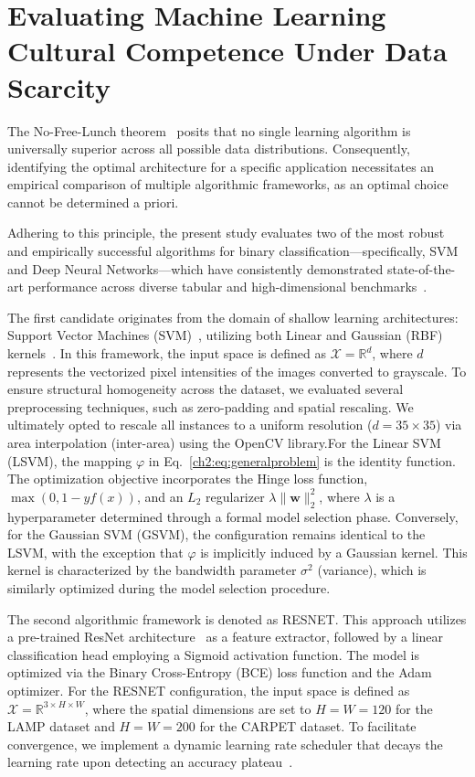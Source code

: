 \section{Evaluating Machine Learning Cultural Competence Under Data Scarcity}
\label{ch3:sec:exp_standard_ml}
%
The No-Free-Lunch theorem~\citep{wolpert1996lack} posits that no single learning algorithm is universally superior across all possible data distributions.
Consequently, identifying the optimal architecture for a specific application necessitates an empirical comparison of multiple algorithmic frameworks, as an optimal choice cannot be determined a priori.

Adhering to this principle, the present study evaluates two of the most robust and empirically successful algorithms for binary classification—specifically, SVM and Deep Neural Networks—which have consistently demonstrated state-of-the-art performance across diverse tabular and high-dimensional benchmarks~\citep{fernandez2014we,wainberg2016random,shu2021zoo}.

The first candidate originates from the domain of shallow learning architectures: Support Vector Machines (SVM)~\citep{shalev2014understanding}, utilizing both Linear and Gaussian (RBF) kernels~\citep{6790031}. 
In this framework, the input space is defined as $\mathcal{X} = \mathbb{R}^d$, where $d$ represents the vectorized pixel intensities of the images converted to grayscale.
To ensure structural homogeneity across the dataset, we evaluated several preprocessing techniques, such as zero-padding and spatial rescaling. We ultimately opted to rescale all instances to a uniform resolution ($d = 35 \times 35$) via area interpolation (inter-area) using the OpenCV library.For the Linear SVM (LSVM), the mapping $\varphi$ in Eq.~\eqref{ch2:eq:generalproblem} is the identity function. 
The optimization objective incorporates the Hinge loss function, $\max(0, 1 - y f(x))$, and an $L_2$ regularizer $\lambda \| \mathbf{w} \|^2_2$, where $\lambda$ is a hyperparameter determined through a formal model selection phase. 
Conversely, for the Gaussian SVM (GSVM), the configuration remains identical to the LSVM, with the exception that $\varphi$ is implicitly induced by a Gaussian kernel. 
This kernel is characterized by the bandwidth parameter $\sigma^2$ (variance), which is similarly optimized during the model selection procedure.

The second algorithmic framework is denoted as RESNET. 
This approach utilizes a pre-trained ResNet architecture~\citep{He_2016_CVPR} as a feature extractor, followed by a linear classification head employing a Sigmoid activation function. 
The model is optimized via the Binary Cross-Entropy (BCE) loss function and the Adam optimizer.
For the RESNET configuration, the input space is defined as $\mathcal{X} = \mathbb{R}^{3 \times H \times W}$, where the spatial dimensions are set to $H = W = 120$ for the LAMP dataset and $H = W = 200$ for the CARPET dataset. 
To facilitate convergence, we implement a dynamic learning rate scheduler that decays the learning rate upon detecting an accuracy plateau~\citep{goodfellow2016deep}.

